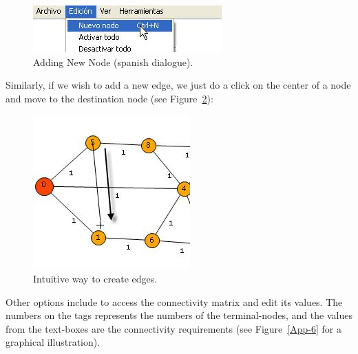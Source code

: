 \begin{figure}[H]
\begin{center}
\includegraphics[scale=1.5]{8.jpg}
\caption{Adding New Node (spanish dialogue).}\label{App-4}
\end{center} 
\end{figure}
Similarly, if we wish to add a new edge, we just do a click on the center of a node and move to the destination node (see Figure~\ref{App-5}):

\begin{figure}[H]
\begin{center}
\includegraphics[scale=1.5]{9.jpg}
\caption{Intuitive way to create edges.}\label{App-5}
\end{center} 
\end{figure}
Other options include to access the connectivity matrix and edit its values. 
The numbers on the tags represents the numbers of the terminal-nodes, and the values from the text-boxes 
are the connectivity requirements (see Figure~\ref{App-6} for a graphical illustration).


